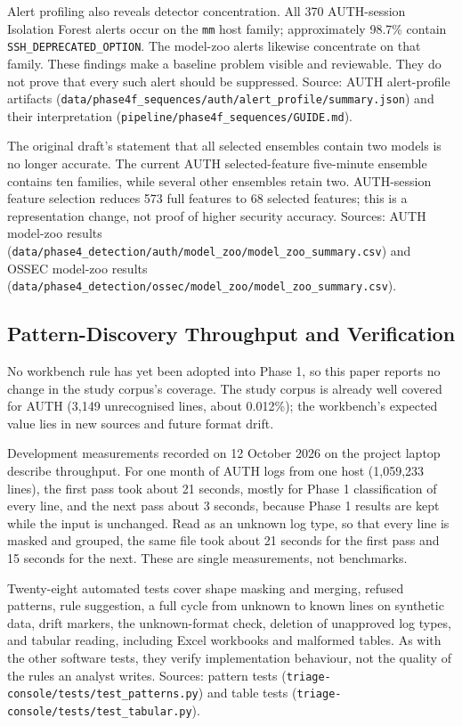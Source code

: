 \documentclass[11pt,a4paper]{article}
\newcommand{\projectref}[2]{#1 {\footnotesize(\nolinkurl{#2})}}
\begin{document}
Alert profiling also reveals detector concentration. All 370 AUTH-session Isolation Forest alerts occur on the \nolinkurl{mm} host family; approximately 98.7\% contain \nolinkurl{SSH_DEPRECATED_OPTION}. The model-zoo alerts likewise concentrate on that family. These findings make a baseline problem visible and reviewable. They do not prove that every such alert should be suppressed. Source: \projectref{AUTH alert-profile artifacts}{data/phase4f_sequences/auth/alert_profile/summary.json} and \projectref{their interpretation}{pipeline/phase4f_sequences/GUIDE.md}.

The original draft's statement that all selected ensembles contain two models is no longer accurate. The current AUTH selected-feature five-minute ensemble contains ten families, while several other ensembles retain two. AUTH-session feature selection reduces 573 full features to 68 selected features; this is a representation change, not proof of higher security accuracy. Sources: \projectref{AUTH model-zoo results}{data/phase4_detection/auth/model_zoo/model_zoo_summary.csv} and \projectref{OSSEC model-zoo results}{data/phase4_detection/ossec/model_zoo/model_zoo_summary.csv}.

\subsection{Pattern-Discovery Throughput and Verification}

No workbench rule has yet been adopted into Phase 1, so this paper reports no change in the study corpus's coverage. The study corpus is already well covered for AUTH (3,149 unrecognised lines, about 0.012\%); the workbench's expected value lies in new sources and future format drift.

Development measurements recorded on 12 October 2026 on the project laptop describe throughput. For one month of AUTH logs from one host (1,059,233 lines), the first pass took about 21 seconds, mostly for Phase 1 classification of every line, and the next pass about 3 seconds, because Phase 1 results are kept while the input is unchanged. Read as an unknown log type, so that every line is masked and grouped, the same file took about 21 seconds for the first pass and 15 seconds for the next. These are single measurements, not benchmarks.

Twenty-eight automated tests cover shape masking and merging, refused patterns, rule suggestion, a full cycle from unknown to known lines on synthetic data, drift markers, the unknown-format check, deletion of unapproved log types, and tabular reading, including Excel workbooks and malformed tables. As with the other software tests, they verify implementation behaviour, not the quality of the rules an analyst writes. Sources: \projectref{pattern tests}{triage-console/tests/test_patterns.py} and \projectref{table tests}{triage-console/tests/test_tabular.py}.
\end{document}
